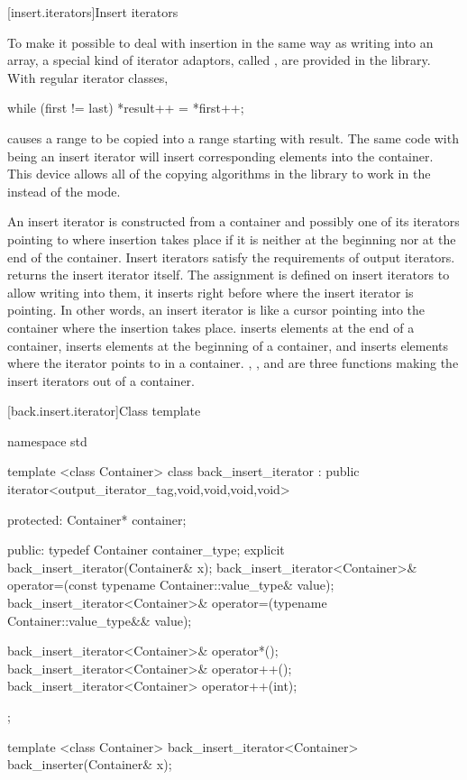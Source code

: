 [insert.iterators]{Insert iterators}

\pnum
To make it possible to deal with insertion in the same way as writing into an array, a special kind of iterator
adaptors, called
,
are provided in the library.
With regular iterator classes,

\begin{codeblock}
while (first != last) *result++ = *first++;
\end{codeblock}

causes a range 
to be copied into a range starting with result.
The same code with
being an insert iterator will insert corresponding elements into the container.
This device allows all of the
copying algorithms in the library to work in the
instead of the  mode.

\pnum
An insert iterator is constructed from a container and possibly one of its iterators pointing to where
insertion takes place if it is neither at the beginning nor at the end of the container.
Insert iterators satisfy the requirements of output iterators.
returns the insert iterator itself.
The assignment
is defined on insert iterators to allow writing into them, it inserts
right before where the insert iterator is pointing.
In other words, an insert iterator is like a cursor pointing into the
container where the insertion takes place.
inserts elements at the end of a container,
inserts elements at the beginning of a container, and
inserts elements where the iterator points to in a container.
,
,
and
are three
functions making the insert iterators out of a container.

[back.insert.iterator]{Class template }

%
\begin{codeblock}
namespace std {
  template <class Container>
  class back_insert_iterator :
    public iterator<output_iterator_tag,void,void,void,void> {
  protected:
    Container* container;

  public:
    typedef Container container_type;
    explicit back_insert_iterator(Container& x);
    back_insert_iterator<Container>&
      operator=(const typename Container::value_type& value);
    back_insert_iterator<Container>&
      operator=(typename Container::value_type&& value);

    back_insert_iterator<Container>& operator*();
    back_insert_iterator<Container>& operator++();
    back_insert_iterator<Container>  operator++(int);
  };

  template <class Container>
    back_insert_iterator<Container> back_inserter(Container& x);
}
\end{codeblock}

